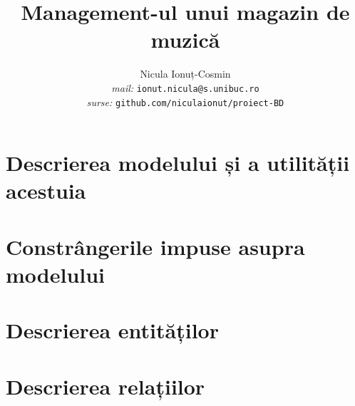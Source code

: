 \documentclass[a4paper,oneside, 12pt]{article}
\title{Management-ul unui magazin de muzică}
\author{Nicula Ionuț-Cosmin \\ \emph{mail: }\texttt{ionut.nicula@s.unibuc.ro} \\ \emph{surse: }\texttt{github.com/niculaionut/proiect-BD}}
\begin{document}
\maketitle

\section{Descrierea modelului și a utilității acestuia}

\section{Constrângerile impuse asupra modelului}

\section{Descrierea entităților}

\section{Descrierea relațiilor}
\end{document}
